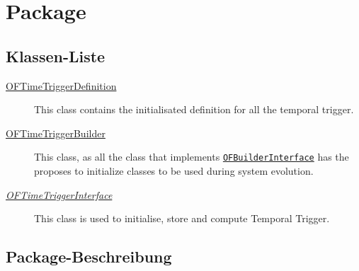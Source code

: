 
\chapter[Package ontologyFramework.OFEventManagement.OFTimeTriggerManagement]{Package }\label{ontologyFramework.OFEventManagement.OFTimeTriggerManagement-package}



\section{Klassen-Liste}
\begin{description}
\item[{\hyperlink{ontologyFramework.OFEventManagement.OFTimeTriggerManagement.OFTimeTriggerDefinition-class}{OFTimeTriggerDefinition}}]
This class contains the initialisated definition for all the temporal trigger.
\hfill\pageref{ontologyFramework.OFEventManagement.OFTimeTriggerManagement.OFTimeTriggerDefinition-class}

\item[{\hyperlink{ontologyFramework.OFEventManagement.OFTimeTriggerManagement.OFTimeTriggerBuilder-class}{OFTimeTriggerBuilder}}]
This class, as all the class that implements \texttt{\hyperlink{ontologyFramework.OFRunning.OFInitialising.OFBuilderInterface<T>-class}{OFBuilderInterface}} has the proposes to initialize
 classes to be used during system evolution.
\hfill\pageref{ontologyFramework.OFEventManagement.OFTimeTriggerManagement.OFTimeTriggerBuilder-class}

\item[{\textit{\hyperlink{ontologyFramework.OFEventManagement.OFTimeTriggerManagement.OFTimeTriggerInterface-class}{OFTimeTriggerInterface}}}]
This class is used to initialise, store and compute Temporal Trigger.
\hfill\pageref{ontologyFramework.OFEventManagement.OFTimeTriggerManagement.OFTimeTriggerInterface-class}

\end{description}
\section{Package-Beschreibung}




